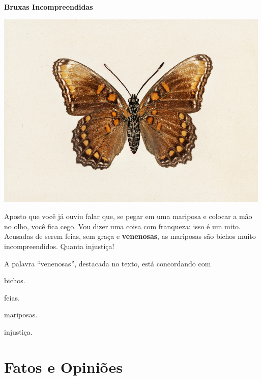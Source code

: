 \begin{conteudo}
\begin{conteudo}
\begin{conteudo}
\begin{conteudo}
\begin{conteudo}
\begin{myquote}
\textbf{Bruxas Incompreendidas}

\begin{center}
\includegraphics[width=\textwidth]{media/image24c.jpg}
\end{center}

Aposto que você já ouviu falar que, se pegar em uma mariposa e colocar a
mão no olho, você fica cego. Vou dizer uma coisa com franqueza: isso é
um mito. Acusadas de serem feias, sem graça e \textbf{venenosas}, as
mariposas são bichos muito incompreendidos. Quanta injustiça!

\end{myquote}

A palavra ``venenosas'', destacada no texto, está concordando com

\begin{escolha}
\item bichos.

\item feias.

\item mariposas.

\item injustiça.
\end{escolha}

\chapter{Fatos e Opiniões}


\end{conteudo}
\end{conteudo}
\end{conteudo}
\end{conteudo}
\end{conteudo}
